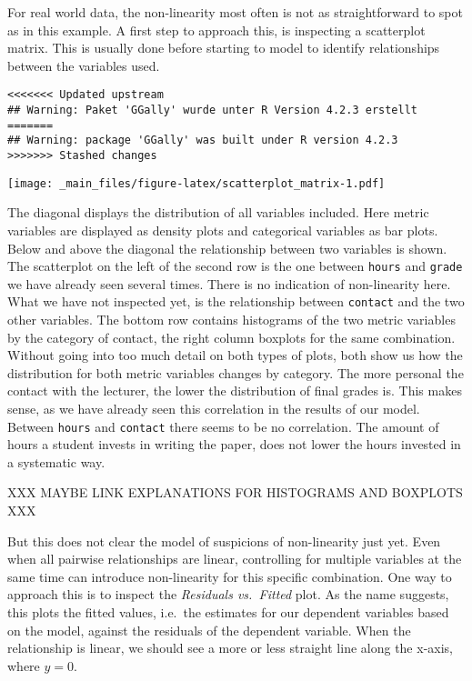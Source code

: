 \documentclass[
]{book}
\begin{document}
For real world data, the non-linearity most often is not as straightforward to
spot as in this example. A first step to approach this, is inspecting a
scatterplot matrix. This is usually done before starting to model to identify
relationships between the variables used.

\begin{verbatim}
<<<<<<< Updated upstream
## Warning: Paket 'GGally' wurde unter R Version 4.2.3 erstellt
=======
## Warning: package 'GGally' was built under R version 4.2.3
>>>>>>> Stashed changes
\end{verbatim}

\texttt{[image: \_main\_files/figure-latex/scatterplot\_matrix-1.pdf]}

The diagonal displays the distribution of all variables included. Here metric
variables are displayed as density plots and categorical variables as bar plots.
Below and above the diagonal the relationship between two variables is shown.
The scatterplot on the left of the second row is the one between \texttt{hours} and
\texttt{grade} we have already seen several times. There is no indication of
non-linearity here. What we have not inspected yet, is the relationship
between \texttt{contact} and the two other variables.
The bottom row contains histograms of the two metric variables by the category
of contact, the right column boxplots for the same combination. Without going
into too much detail on both types of plots, both show us how the distribution
for both metric variables changes by category. The more personal the contact
with the lecturer, the lower the distribution of final grades is. This makes
sense, as we have already seen this correlation in the results of our model.
Between \texttt{hours} and \texttt{contact} there seems to be no correlation. The amount of
hours a student invests in writing the paper, does not lower the hours invested
in a systematic way.

XXX MAYBE LINK EXPLANATIONS FOR HISTOGRAMS AND BOXPLOTS XXX

But this does not clear the model of suspicions of non-linearity just yet. Even
when all pairwise relationships are linear, controlling for multiple variables
at the same time can introduce non-linearity for this specific combination.
One way to approach this is to inspect the \emph{Residuals vs.~Fitted} plot. As the
name suggests, this plots the fitted values, i.e.~the estimates for our
dependent variables based on the model, against the residuals of the dependent
variable. When the relationship is linear, we should see a more or less straight
line along the x-axis, where \(y = 0\).
\end{document}
